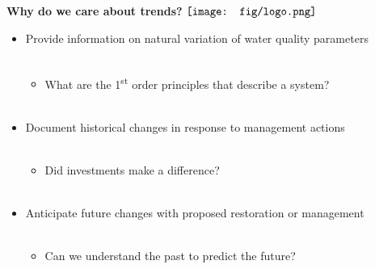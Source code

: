 \documentclass{beamer}
\begin{document}
\begin{frame}{\textbf{Why do we care about trends?} \hspace{0pt plus 1 filll} $\vcenter{\hbox{\texttt{[image: fig/logo.png]}}}$}
\begin{itemize}
\item Provide information on natural variation of water quality parameters \\~\\
\begin{itemize}
\item What are the 1\textsuperscript{st} order principles that describe a system? \\~\\
\end{itemize}
\item Document historical changes in response to management actions \\~\\
\begin{itemize}
\item Did investments make a difference? \\~\\
\end{itemize}
\item Anticipate future changes with proposed restoration or management \\~\\
\begin{itemize}
\item Can we understand the past to predict the future?
\end{itemize}
\end{itemize}
\end{frame}
\end{document}
